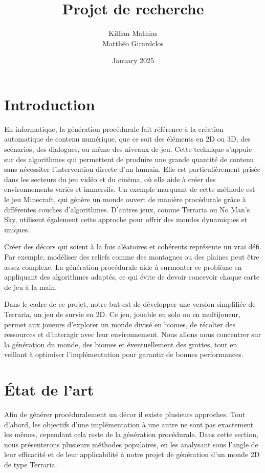 \documentclass{article}
\title{Projet de recherche}
\author{Killian Mathias\\ Matthéo Girardclos}
\date{January 2025}
\begin{document}
\maketitle
\tableofcontents

\section{Introduction}

En informatique, la génération procédurale fait référence à la création automatique de contenu numérique, que ce soit des éléments en 2D ou 3D, des scénarios, des dialogues, ou même des niveaux de jeu. Cette technique s'appuie sur des algorithmes qui permettent de produire une grande quantité de contenu sans nécessiter l'intervention directe d'un humain. Elle est particulièrement prisée dans les secteurs du jeu vidéo et du cinéma, où elle aide à créer des environnements variés et immersifs.  Un exemple marquant de cette méthode est le jeu Minecraft, qui génère un monde ouvert de manière procédurale grâce à différentes couches d'algorithmes. D'autres jeux, comme Terraria ou No Man’s Sky, utilisent également cette approche pour offrir des mondes dynamiques et uniques.\par
Créer des décors qui soient à la fois aléatoires et cohérents représente un vrai défi. Par exemple, modéliser des reliefs comme des montagnes ou des plaines peut être assez complexe. La génération procédurale aide à surmonter ce problème en appliquant des algorithmes adaptés, ce qui évite de devoir concevoir chaque carte de jeu à la main.\par
  Dans le cadre de ce projet, notre but est de développer une version simplifiée de Terraria, un jeu de survie en 2D. Ce jeu, jouable en solo ou en multijoueur, permet aux joueurs d'explorer un monde divisé en biomes, de récolter des ressources et d'interagir avec leur environnement. Nous allons nous concentrer sur la génération du monde, des biomes et éventuellement des grottes, tout en veillant à optimiser l'implémentation pour garantir de bonnes performances.


\section{État de l'art}

Afin de générer procéduralement un décor il existe plusieurs approches. Tout d'abord, les objectifs d'une implémentation à une autre ne sont pas exactement les mêmes, cependant cela reste de la génération procédurale. Dans cette section, nous présenterons plusieurs méthodes populaires, en les analysant sous l’angle de leur efficacité et de leur applicabilité à notre projet de génération d’un monde 2D de type Terraria.
\end{document}
